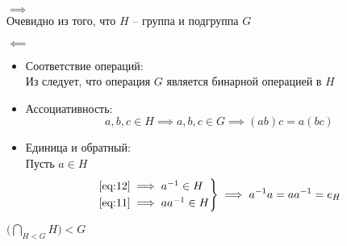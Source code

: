 \begin{iproof}
	\item $ \implies $ \\
	Очевидно из того, что $ H $ -- группа и подгруппа $ G $
	\item $ \impliedby $
	\begin{itemize}
		\item Соответствие операций: \\
		Из  следует, что операция $ G $ является бинарной операцией в $ H $
		\item Ассоциативность:
		$$ a, b, c \in H \implies a, b, c \in G \implies (ab)c = a(bc) $$
		\item Единица и обратный: \\
		Пусть $ a \in H $
		$$
		\begin{rcases}
			\eref{12} \implies a^{-1} \in H \\
			\eref{11} \implies aa^{-1} \in H
		\end{rcases} \implies a^{-1}a = aa^{-1} = e_H $$
	\end{itemize}
\end{iproof}

\begin{implication}
	$ \bigg( \bigcap_{H < G} H \bigg) < G $
\end{implication}

